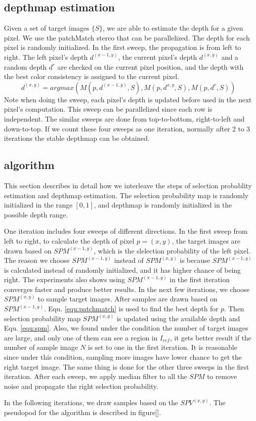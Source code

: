 \subsection{depthmap estimation}
Given a set of target images $\{S\}$, we are able to estimate the depth for a given pixel. We use the patchMatch stereo \cite{patchMatchStereo3} that can be parallelized. 
The depth for each pixel is randomly initialized. In the first sweep, the propagation is from left to right. The left pixel's depth $d^{(x-1,y)}$, the current pixel's depth $d^{(x,y)}$ and a random depth $d^r$ are checked on the current pixel position, and the depth with the best color consistency is assigned to the current pixel.
\begin{equation}    
    d^{(x,y)} = argmax( M(p,d^{(x-1, y)}, {S}), M(p,d^{x,y},{S}), M(p,d^r,{S}))   \label{equ:patchmatch}
\end{equation} 
Note when doing the sweep, each pixel's depth is updated before used in the next pixel's computation. This sweep can be parallelized since each row is independent. The similar sweeps are done from top-to-bottom, right-to-left and down-to-top. If we count these four sweeps as one iteration, normally after 2 to 3 iterations the stable depthmap can be obtained.

\subsection{algorithm}
This section describes in detail how we interleave the steps of selection probablity estimation and depthmap estimation. The selection probability map is randomly initialized in the range $[0, 1]$, and depthmap is randomly initialized in the possible depth range. 

One iteration includes four sweeps of different directions. In the first sweep from left to right, to calculate the depth of pixel $p = (x, y)$, the target images are drawn based on $SPM^{(x-1,y)}$, which is the slelection probability of the left pixel. The reason we choose $SPM^{(x-1,y)}$ instead of $SPM^(x,y)$ is because $SPM^(x-1,y)$ is calculated instead of randomly initialized, and it has higher chance of being right. The experiments also shows using $SPM^(x-1,y)$ in the first iteration converges faster and produce better results. In the next few iterations, we choose $SPM^(x,y)$ to sample target images. After samples are drawn based on $SPM^(x-1,y)$. Equ. \ref{equ:patchmatch} is used to find the best depth for $p$. Then selection probability map $SPM^{(x,y)}$ is updated using the available depth and Equ. \ref{equ:spm}. Also, we found under the condition the number of target images are large, and only one of them can see a region in $I_{ref}$, it gets better result if the number of sample image $N$ is set to one in the first iteration. It is reasonable since under this condition, sampling more images have lower chance to get the right target image. The same thing is done for the other three sweeps in the first iteration. After each sweep, we apply median filter to all the $SPM$ to remove noise and propagate the right selection probability. 

In the following iterations, we draw samples based on the $SPV^{(x,y)}$. The pseudopod for the algorithm is described in figure[]. 



